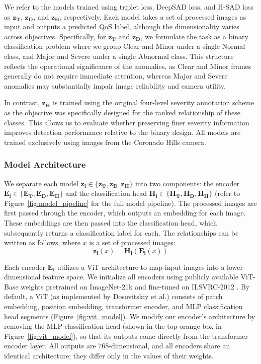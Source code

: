 \documentclass[remotesensing,article,submit,moreauthors]{Definitions/mdpi}
\begin{document}
We refer to the models trained using triplet loss, \ac{DeepSAD} loss, and \ac{H-SAD} loss as $\mathbf{z_T}$,  $\mathbf{z_D}$, and $\mathbf{z_H}$, respectively. Each model takes a set of processed images as input and outputs a predicted \ac{QoS} label, although the dimensionality varies across objectives. Specifically, for $\mathbf{z_T}$ and $\mathbf{z_D}$, we formulate the task as a binary classification problem where we group Clear and Minor under a single Normal class, and Major and Severe under a single Abnormal class. This structure reflects the operational significance of the anomalies, as Clear and Minor frames generally do not require immediate attention, whereas Major and Severe anomalies may substantially impair image reliability and camera utility. 

In contrast, $\mathbf{z_H}$ is trained using the original four-level severity annotation scheme as the objective was specifically designed for the ranked relationship of these classes. This allows us to evaluate whether preserving finer severity information improves detection performance relative to the binary design. All models are trained exclusively using images from the Coronado Hills camera. 

\subsubsection{Model Architecture}
\label{sec:architecture}

We separate each model $\mathbf{z_i} \in \{\mathbf{z_T}, \mathbf{z_D}, \mathbf{z_H}\}$ into two components: the encoder $\mathbf{E_i} \in \{\mathbf{E_T}, \mathbf{E_D}, \mathbf{E_H}\}$ and the classification head $\mathbf{H_i} \in \{\mathbf{H_T}, \mathbf{H_D}, \mathbf{H_H}\}$ (refer to Figure~\ref{fig:model_pipeline} for the full model pipeline). The processed images are first passed through the encoder, which outputs an embedding for each image. These embeddings are then passed into the classification head, which subsequently returns a classification label for each. The relationships can be written as follows, where $x$ is a set of processed images:
\[\mathbf{z_i}(x) = \mathbf{H_i}(\mathbf{E_i}(x))\] 

Each encoder $\mathbf{E_i}$ utilizes a \ac{ViT} architecture to map input images into a lower-dimensional feature space. We initialize all encoders using publicly available ViT-Base weights pretrained on ImageNet-21k and fine-tuned on ILSVRC-2012 \cite{deng2009imagenet, wu2020visual}. By default, a ViT (as implemented by Dosovitskiy et al.) consists of patch embedding, position embedding, transformer encoder, and \ac{MLP} classification head segments (Figure~\ref{fig:vit_model}). We modify our encoder's architecture by removing the \ac{MLP} classification head (shown in the top orange box in Figure~\ref{fig:vit_model}), so that its outputs come directly from the transformer encoder layer. All outputs are 768-dimensional, and all encoders share an identical architecture; they differ only in the values of their weights. 
\end{document}
